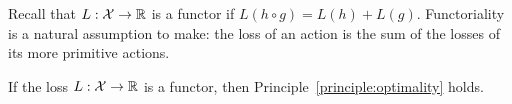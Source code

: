 \documentclass[a4paper]{ifacconf}
\begin{document}
Recall that \(L: \mathcal{X} \to \mathbb{R}\) is a functor if \(L(h \circ g) = L(h) + L(g).\)
Functoriality is a natural assumption to make:
the loss of an action is the sum of the losses of its more primitive actions.
%
\begin{thm}
  \label{thm:FunctorialLoss}
  If the loss \(L: \mathcal{X} \to \mathbb{R}\) is a functor, then Principle~\ref{principle:optimality} holds.
\end{thm}

\end{document}
